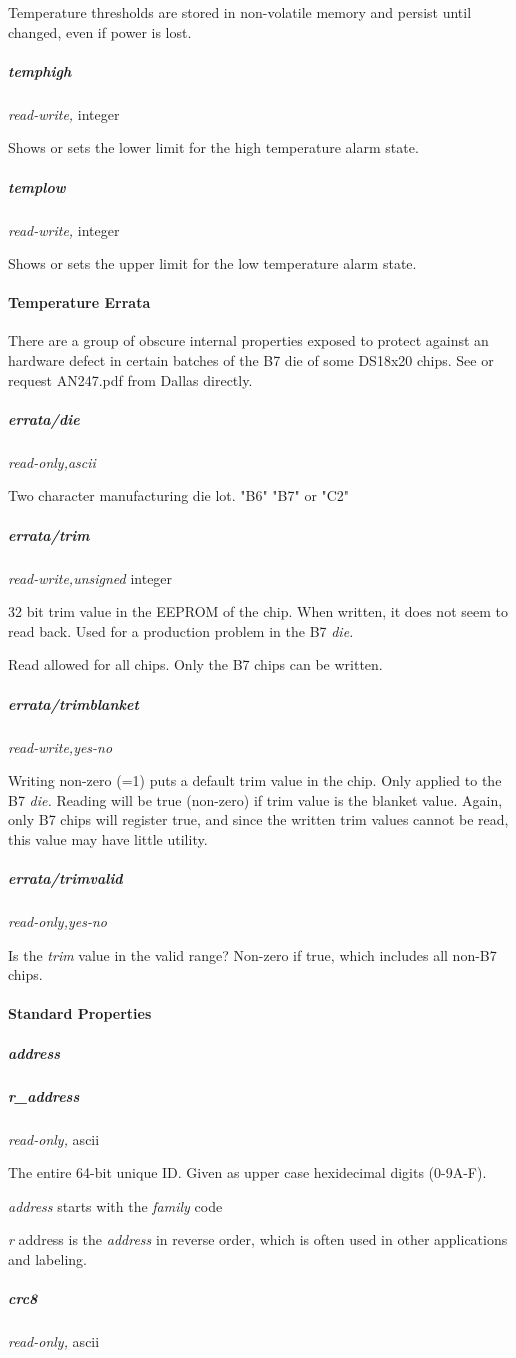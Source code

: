 Temperature
thresholds are stored in non-volatile memory and persist until changed,
even if power is lost. 
\subparagraph*{temphigh}\textit{read-write,} integer 

Shows or sets the lower limit for the high temperature alarm state.  
\subparagraph*{templow}\textit{read-write,}
integer 

Shows or sets the upper limit for the low temperature alarm state.   
\paragraph*{Temperature
Errata}
There are a group of obscure internal properties exposed to protect
against an hardware defect in certain batches of the B7 die of some DS18x20
chips. See  or request AN247.pdf from Dallas
directly. 
\subparagraph*{errata/die}\textit{read-only,ascii} 

Two character manufacturing die lot. "B6" "B7" or "C2" 
\subparagraph*{errata/trim}\textit{read-write,unsigned}
integer 

32 bit trim value in the EEPROM of the chip. When written, it does not seem
to read back. Used for a production problem in the B7 \textit{die.} 

Read allowed for
all chips. Only the B7 chips can be written. 
\subparagraph*{errata/trimblanket}\textit{read-write,yes-no}


Writing non-zero (=1) puts a default trim value in the chip. Only applied
to the B7 \textit{die.} Reading will be true (non-zero) if trim value is the blanket
value. Again, only B7 chips will register true, and since the written trim
values cannot be read, this value may have little utility. 
\subparagraph*{errata/trimvalid}\textit{read-only,yes-no}


Is the  \textit{trim}  value in the valid range? Non-zero if true, which includes
all non-B7 chips.  
\paragraph*{Standard Properties}
          
\subparagraph*{address}
\subparagraph*{r\_address}\textit{read-only,}
ascii 

The entire 64-bit unique ID. Given as upper case hexidecimal digits (0-9A-F).


\textit{address} starts with the \textit{family} code 

\textit{r} address is the \textit{address} in reverse order, which is often used in other
applications and labeling. 
\subparagraph*{crc8}\textit{read-only,} ascii 


